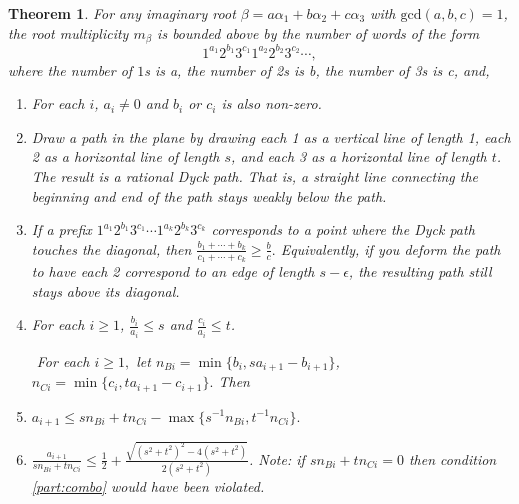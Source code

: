 \documentclass{amsart}
\numberwithin{equation}{section}
\numberwithin{figure}{section}
\numberwithin{table}{section}
\newtheorem{Theorem}[equation]{Theorem}
\theoremstyle{definition}
\begin{document}
\begin{Theorem} \label{th:main} 
For any imaginary root $\beta= a\alpha_1+b\alpha_2+c \alpha_3$ with $\text{gcd}(a,b,c)=1$, the root multiplicity $m_\beta$ is bounded above by the number of words of the form 
\begin{equation}1^{a_1} 2^{b_1}3^{c_1} 1^{a_2} 2^{b_2} 3^{c_2} \cdots,\end{equation}
where the number of $1$s is a, the number of 2s is b, the number of 3s is c, 
and, 
\begin{enumerate}

\item \label{main0} For each $i$, $a_i \neq 0$ and $b_i$ or $c_i$ is also non-zero. 


\item \label{main1} Draw a path in the plane by drawing each 1 as a vertical line of length 1, each 2 as a horizontal line of length $s$, and each 3 as a horizontal line of length $t$. The result is a rational Dyck path. That is, a straight line connecting the beginning and end of the path stays weakly below the path. 

\item \label{main2}  If a prefix $1^{a_1} 2^{b_1}3^{c_1} \cdots 1^{a_k} 2^{b_k}3^{c_k}$ corresponds to a point where the Dyck path touches the diagonal, then $\displaystyle  \frac{b_1+\cdots +b_k}{c_1+\cdots+c_k} \geq  \frac{b}{c}.$ Equivalently, if you deform the path to have each 2 correspond to an edge of length $s-\epsilon$, the resulting path still stays above its diagonal. 

\item \label{part:main3easy-s} For each $i \geq 1$,   $\displaystyle  \frac{b_i}{a_i} \leq s$ and  $\displaystyle  \frac{c_i}{a_i} \leq t$. 


\noindent $\mbox{}$ \hspace{-1.7cm} For each $i\geq 1,$ let $n_{Bi}=  \min \{ b_i, s a_{i+1}-b_{i+1}\}$,  $n_{Ci}=  \min \{ c_i, t a_{i+1}-c_{i+1}\}.$ Then

\item  \label{part:combo} $\displaystyle a_{i+1} \leq s n_{Bi}+tn_{Ci}- \max \{s^{-1} n_{Bi}, t^{-1} n_{Ci} \}.$

\item \label{part:ratio} $\displaystyle \frac{a_{i+1}}{sn_{Bi}+tn_{Ci}} \leq \frac{1}{2}+\frac{\sqrt{(s^2+t^2)^2-4(s^2+t^2)}}{2(s^2+t^2)}$. Note: if $sn_{Bi}+tn_{Ci}=0$ then condition \eqref{part:combo} would have been violated.  




\end{enumerate}
\end{Theorem}
\end{document}
